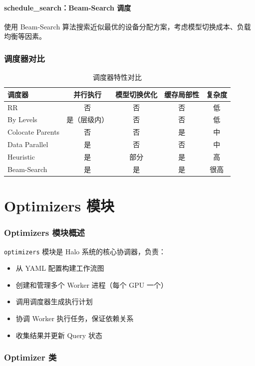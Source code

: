 \documentclass[12pt,a4paper]{article}
\begin{document}
\subsection{schedule\_search：Beam-Search 调度}

使用 Beam-Search 算法搜索近似最优的设备分配方案，考虑模型切换成本、负载均衡等因素。

\section{调度器对比}

\begin{table}[h]
\centering
\begin{tabular}{|l|c|c|c|c|}
\hline
调度器 & 并行执行 & 模型切换优化 & 缓存局部性 & 复杂度 \\
\hline
RR & 否 & 否 & 否 & 低 \\
\hline
By Levels & 是（层级内） & 否 & 否 & 低 \\
\hline
Colocate Parents & 否 & 否 & 是 & 中 \\
\hline
Data Parallel & 是 & 否 & 否 & 中 \\
\hline
Heuristic & 是 & 部分 & 是 & 高 \\
\hline
Beam-Search & 是 & 是 & 是 & 很高 \\
\hline
\end{tabular}
\caption{调度器特性对比}
\end{table}

\part{Optimizers 模块}

\section{Optimizers 模块概述}

\texttt{optimizers} 模块是 Halo 系统的核心协调器，负责：
\begin{itemize}
    \item 从 YAML 配置构建工作流图
    \item 创建和管理多个 Worker 进程（每个 GPU 一个）
    \item 调用调度器生成执行计划
    \item 协调 Worker 执行任务，保证依赖关系
    \item 收集结果并更新 Query 状态
\end{itemize}

\section{Optimizer 类}
\end{document}
